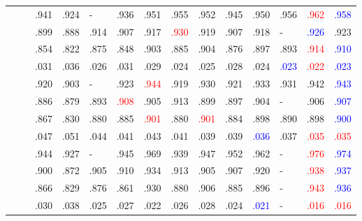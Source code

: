 \documentclass[runningheads]{llncs}
\begin{document}
\begin{table}[t]
\begin{center}
\begin{tabular}{p{0.7cm}<{\centering}|c|p{0.85cm}<{\centering}cp{0.75cm}<{\centering}p{0.75cm}<{\centering}cccccp{0.75cm}<{\centering}|cc}
				\multirow{4}{*}{\rotatebox{90}{NLPR}~\rotatebox{90}{~\cite{peng2014rgbd}}}    
				&  
				& .941 & .924 & - & .936 & .951 & .955 & .952 & .945 & .950 & .956 & \textcolor{red}{.962} & \textcolor{blue}{.958} \\
				&  
				& .899 & .888 & .914 & .907 & .917 & \textcolor{red}{.930} & .919 & .907 & .918 & - & \textcolor{blue}{.926} & .923 \\
				&  
				& .854 & .822 & .875 & .848 & .903 & .885 & .904 & .876 & .897 & .893 & \textcolor{red}{.914} & \textcolor{blue}{.910} \\
				&  
				& .031 & .036 & .026 & .031 & .029 & .024 & .025 & .028 & .024 & \textcolor{blue}{.023} & \textcolor{red}{.022} & \textcolor{blue}{.023} \\ \hline
				
				\multirow{4}{*}{\rotatebox{90}{STERE}~\rotatebox{90}{~~\cite{niu2012leveraging}}}    
				&  
				& .920 & .903 & - & .923 & \textcolor{red}{.944} & .919 & .930 & .921 & .933 & .931 & .942 & \textcolor{blue}{.943} \\
				&  
				& .886 & .879 & .893 & \textcolor{red}{.908} & .905 & .913 & .899 & .897 & .904 & - & .906 & \textcolor{blue}{.907} \\
				&  
				& .867 & .830 & .880 & .885 & \textcolor{red}{.901} & .880 & \textcolor{red}{.901} & .884 & .898 & .890 & .898 & \textcolor{blue}{.900} \\
				&  
				& .047 & .051 & .044 & .041 & .043 & .041 & .039 & .039 & \textcolor{blue}{.036} & .037 & \textcolor{red}{.035} & \textcolor{red}{.035} \\ \hline
				
				\multirow{4}{*}{\rotatebox{90}{DES}~\rotatebox{90}{~\cite{cheng2014depth}}}    
				&  
				& .944 & .927 & - & .945 & .969 & .939 & .947 & .952 & .962 & - & \textcolor{red}{.976} & \textcolor{blue}{.974} \\
				&  
				& .900 & .872 & .905 & .910 & .934 & .913 & .905 & .907 & .920 & - & \textcolor{red}{.938} & \textcolor{blue}{.937} \\
				&  
				& .866 & .829 & .876 & .861 & .930 & .880 & .906 & .885 & .896 & - & \textcolor{red}{.943} & \textcolor{blue}{.936} \\
				&  
				& .030 & .038 & .025 & .027 & .022 & .026 & .028 & .024 & \textcolor{blue}{.021} & - & \textcolor{red}{.016} & \textcolor{red}{.016} \\ \hline
				

\end{tabular}
\end{center}
\end{table}
\end{document}

